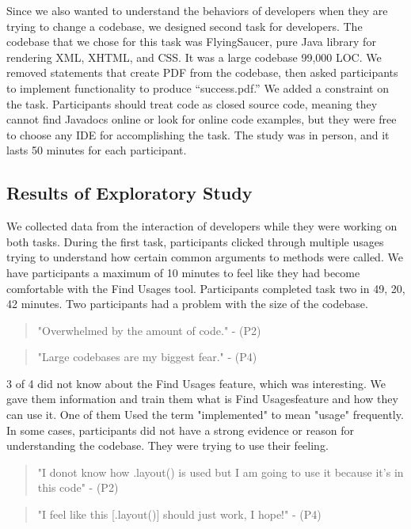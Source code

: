 \documentclass[conference]{IEEEtran}
\begin{document}
Since we also wanted to understand the behaviors of developers when they are trying to change a codebase, we designed second task for developers. The codebase that we chose for this task was FlyingSaucer, pure Java library for rendering XML, XHTML, and CSS. It was a large codebase 99,000 LOC. We removed statements that create PDF from the codebase, then asked participants to implement functionality to produce “success.pdf.” We added a constraint on the task. Participants should treat code as closed source code, meaning they cannot find Javadocs online or look for online code examples, but they were free to choose any IDE for accomplishing the task. The study was in person, and it lasts 50 minutes for each participant. 

\subsection{Results of Exploratory Study}


We collected data from the interaction of developers while they were working on both tasks. During the first task, participants clicked through multiple usages trying to understand how certain common arguments to methods were called. We have participants a maximum of 10 minutes to feel like they had become comfortable with the Find Usages tool. Participants completed task two in 49, 20, 42 minutes. Two participants had a problem with the size of the codebase.
\begin{quote}"Overwhelmed by the amount of code." - (P2) \end{quote}
\begin{quote}"Large codebases are my biggest fear." - (P4) \end{quote}
3 of 4 did not know about the Find Usages feature, which was interesting. We gave them information and train them what is Find Usagesfeature and how they can use it. One of them Used the term "implemented" to mean "usage" frequently. In some cases, participants did not have a strong evidence or reason for understanding the codebase. They were trying to use their feeling. 
\begin{quote}"I donot know how .layout() is used but I am going to use it because it's in this code" - (P2) \end{quote}
\begin{quote}"I feel like this [.layout()] should just work, I hope!" - (P4) \end{quote}
\end{document}

